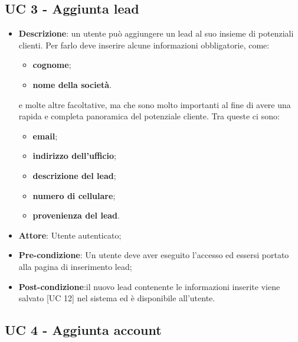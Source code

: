 \subsection{UC 3 - Aggiunta lead}

\begin{itemize}
	\item \textbf{Descrizione}: un utente può aggiungere un lead al suo insieme di potenziali clienti. Per farlo deve inserire alcune informazioni obbligatorie, come:
	\begin{itemize}
		\item \textbf{cognome};
		\item \textbf{nome della società}.
	\end{itemize}
	e molte altre facoltative, ma che sono molto importanti al fine di avere una rapida e completa panoramica del potenziale cliente. Tra queste ci sono:
	\begin{itemize}
		\item \textbf{email};
		\item \textbf{indirizzo dell'ufficio};
		\item \textbf{descrizione del lead};
		\item \textbf{numero di cellulare};
		\item \textbf{provenienza del lead}.
	\end{itemize}
	\item \textbf{Attore}: Utente autenticato;
	\item \textbf{Pre-condizione}: Un utente deve aver eseguito l'accesso ed essersi portato alla pagina di inserimento lead;
	\item \textbf{Post-condizione}:il nuovo lead contenente le informazioni inserite viene salvato [UC 12] nel sistema ed è disponibile all'utente.
\end{itemize}

\subsection{UC 4 - Aggiunta account}

